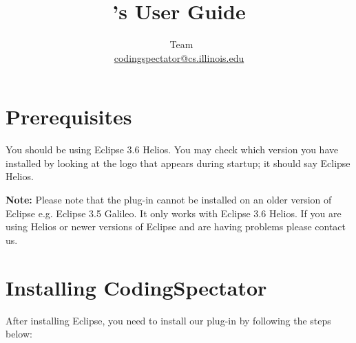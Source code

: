 \documentclass{article}
\title{\codspec's User Guide}
\author{\codspec\
Team\\\href{mailto:codingspectator@cs.illinois.edu}{codingspectator@cs.illinois.edu}}
\newcommand\codspec{CodingSpectator}
\newcommand\warnnote[1]{\textbf{Note: }#1}
\begin{document}
%
\maketitle
%
\tableofcontents
%
\section{Prerequisites}
%
You should be using Eclipse 3.6 Helios. You may check which version you have
installed by looking at the logo that appears during startup; it should say
Eclipse Helios.

\warnnote{Please note that the plug-in cannot be installed on an older version
of Eclipse e.g. Eclipse 3.5 Galileo. It only works with Eclipse 3.6 Helios. If
you are using Helios or newer versions of Eclipse and are having problems please
contact us.}
%
\section{Installing \codspec}

After installing Eclipse, you need to install our plug-in by following the steps
below:
\end{document}
